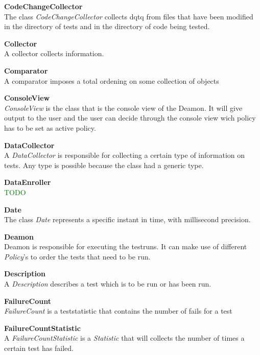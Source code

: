 \documentclass[i2]{oss}
\newcommand{\class}[1]{\emph{#1}}
\newcommand{\gloss}[1]{\textbf{#1}}
\newcommand{\comment}[1]{{\huge \textcolor{green}{#1}}\\}
\begin{document}
\begin{description}
\item \gloss{CodeChangeCollector}\\
The class \class{CodeChangeCollector} collects dqtq from files that have been modified in the directory of tests and in the directory of code being tested. 
	

\item \gloss{Collector}\\
A collector collects information.

\item \gloss{Comparator}\\
A comparator imposes a total ordening on some collection of objects

\item \gloss{ConsoleView}\\
\class{ConsoleView} is the class that is the console view of the Deamon. It will give output to the user and the user can decide through the console view wich policy has to be set as active policy.

\item \gloss{DataCollector}\\
A \class{DataCollector} is responsible for collecting a certain type of information on tests. Any type is possible because the class had a generic type.

\item \gloss{DataEnroller}\\
\comment{TODO}

\item \gloss{Date}\\
The class \class{Date} represents a specific instant in time, with millisecond precision.

\item \gloss{Deamon} \\
	Deamon is responsible for executing the testruns. It can make use of different \class{Policy}'s to order the tests that need to be run.

\item \gloss{Description} \\ A \class{Description} describes a test which is to be run or has been run. 

\item \gloss{FailureCount} \\ 
\class{FailureCount} is a teststatistic that contains the number of fails for a test

\item \gloss{FailureCountStatistic}\\
A \class{FailureCountStatistic} is a \class{Statistic} that will collects the number of times a certain test has failed.


\end{description}
\end{document}
